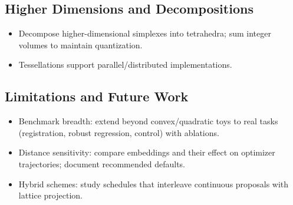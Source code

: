 \documentclass[
  10pt,
]{article}
\providecommand{\tightlist}{%
  \setlength{\itemsep}{0pt}\setlength{\parskip}{0pt}}
\begin{document}
\hypertarget{higher-dimensions-and-decompositions}{%
\subsection{Higher Dimensions and
Decompositions}\label{higher-dimensions-and-decompositions}}

\begin{itemize}
\tightlist
\item
  Decompose higher-dimensional simplexes into tetrahedra; sum integer
  volumes to maintain quantization.
\item
  Tessellations support parallel/distributed implementations.
\end{itemize}

\hypertarget{limitations-and-future-work}{%
\subsection{Limitations and Future
Work}\label{limitations-and-future-work}}

\begin{itemize}
\tightlist
\item
  Benchmark breadth: extend beyond convex/quadratic toys to real tasks
  (registration, robust regression, control) with ablations.
\item
  Distance sensitivity: compare embeddings and their effect on optimizer
  trajectories; document recommended defaults.
\item
  Hybrid schemes: study schedules that interleave continuous proposals
  with lattice projection.
\end{itemize}
\end{document}
